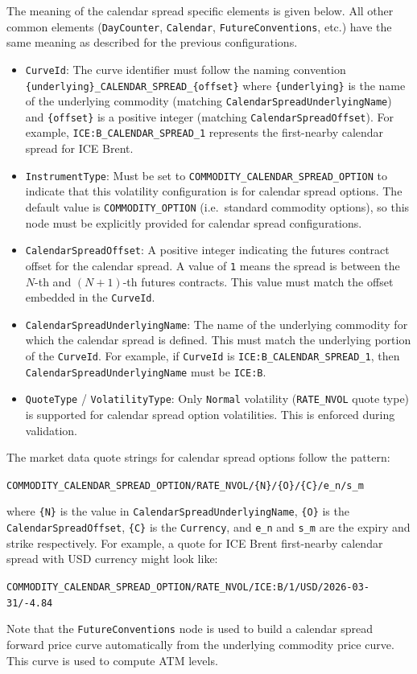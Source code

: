 The meaning of the calendar spread specific elements is given below. All other common elements (\lstinline!DayCounter!, \lstinline!Calendar!, \lstinline!FutureConventions!, etc.) have the same meaning as described for the previous configurations.
\begin{itemize}

\item \lstinline!CurveId!:
The curve identifier must follow the naming convention \lstinline!{underlying}_CALENDAR_SPREAD_{offset}! where \lstinline!{underlying}! is the name of the underlying commodity (matching \lstinline!CalendarSpreadUnderlyingName!) and \lstinline!{offset}! is a positive integer (matching \lstinline!CalendarSpreadOffset!). For example, \lstinline!ICE:B_CALENDAR_SPREAD_1! represents the first-nearby calendar spread for ICE Brent.

\item \lstinline!InstrumentType!:
Must be set to \lstinline!COMMODITY_CALENDAR_SPREAD_OPTION! to indicate that this volatility configuration is for calendar spread options. The default value is \lstinline!COMMODITY_OPTION! (i.e.\ standard commodity options), so this node must be explicitly provided for calendar spread configurations.

\item \lstinline!CalendarSpreadOffset!:
A positive integer indicating the futures contract offset for the calendar spread. A value of \lstinline!1! means the spread is between the $N$-th and $(N+1)$-th futures contracts. This value must match the offset embedded in the \lstinline!CurveId!.

\item \lstinline!CalendarSpreadUnderlyingName!:
The name of the underlying commodity for which the calendar spread is defined. This must match the underlying portion of the \lstinline!CurveId!. For example, if \lstinline!CurveId! is \lstinline!ICE:B_CALENDAR_SPREAD_1!, then \lstinline!CalendarSpreadUnderlyingName! must be \lstinline!ICE:B!.

\item \lstinline!QuoteType! / \lstinline!VolatilityType!:
Only \lstinline!Normal! volatility (\lstinline!RATE_NVOL! quote type) is supported for calendar spread option volatilities. This is enforced during validation.

\end{itemize}

The market data quote strings for calendar spread options follow the pattern:
\begin{center}
\lstinline!COMMODITY_CALENDAR_SPREAD_OPTION/RATE_NVOL/{N}/{O}/{C}/e_n/s_m!
\end{center}
where \lstinline!{N}! is the value in \lstinline!CalendarSpreadUnderlyingName!, \lstinline!{O}! is the \lstinline!CalendarSpreadOffset!, \lstinline!{C}! is the \lstinline!Currency!, and \lstinline!e_n! and \lstinline!s_m! are the expiry and strike respectively. For example, a quote for ICE Brent first-nearby calendar spread with USD currency might look like:
\begin{center}
\lstinline!COMMODITY_CALENDAR_SPREAD_OPTION/RATE_NVOL/ICE:B/1/USD/2026-03-31/-4.84!
\end{center}

Note that the \lstinline!FutureConventions! node is used to build a calendar spread forward price curve automatically from the underlying commodity price curve. This curve is used to compute ATM levels.
